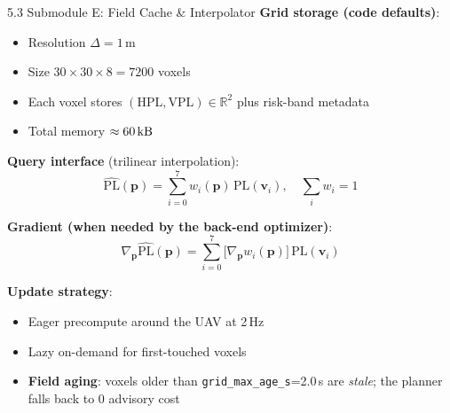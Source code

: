 \documentclass[10pt,aspectratio=169,xcolor=dvipsnames]{beamer}
\newcommand{\PL}{\mathrm{PL}}
\newcommand{\HPL}{\mathrm{HPL}}
\newcommand{\VPL}{\mathrm{VPL}}
\newcommand{\1}{\mathbb{1}}
\newcommand{\R}{\mathbb{R}}
\newcommand{\innov}[1]{\textcolor{NavyBlue}{\textbf{#1}}}
\begin{document}
\begin{frame}[t]{5.3 Submodule E: Field Cache \& Interpolator}
  \scriptsize
  \vspace{-2pt}
  \setlength{\abovedisplayskip}{3pt}
  \setlength{\belowdisplayskip}{3pt}
  \textbf{Grid storage (code defaults)}:
  \begin{itemize}\tiny
      \setlength{\itemsep}{1pt}
    \item Resolution $\Delta=1\,\si{\meter}$
    \item Size $30\times 30\times 8 = 7200$ voxels
    \item Each voxel stores $(\HPL,\VPL)\in\R^2$ plus risk-band metadata
    \item Total memory $\approx 60\,\si{\kilo\byte}$
  \end{itemize}

  \vspace{1pt}
  \textbf{Query interface} (trilinear interpolation):
  \[
    \widehat{\PL}(\bm{p})=\sum_{i=0}^{7}w_i(\bm{p})\,\PL(\bm{v}_i),\quad\sum_i w_i=1
  \]

  \textbf{Gradient (when needed by the back-end optimizer)}:
  \[
    \nabla_{\bm{p}}\widehat{\PL}(\bm{p})=\sum_{i=0}^{7}\bigl[\nabla_{\bm{p}}w_i(\bm{p})\bigr]\,\PL(\bm{v}_i)
  \]

  \vspace{1pt}
  \textbf{Update strategy}:
  \begin{itemize}\tiny
      \setlength{\itemsep}{1pt}
    \item Eager precompute around the UAV at 2\,Hz
    \item Lazy on-demand for first-touched voxels
    \item \innov{Field aging}: voxels older than \texttt{grid\_max\_age\_s}=2.0\,\si{\second} are \emph{stale}; the planner falls back to 0 advisory cost
  \end{itemize}
\end{frame}
\end{document}
